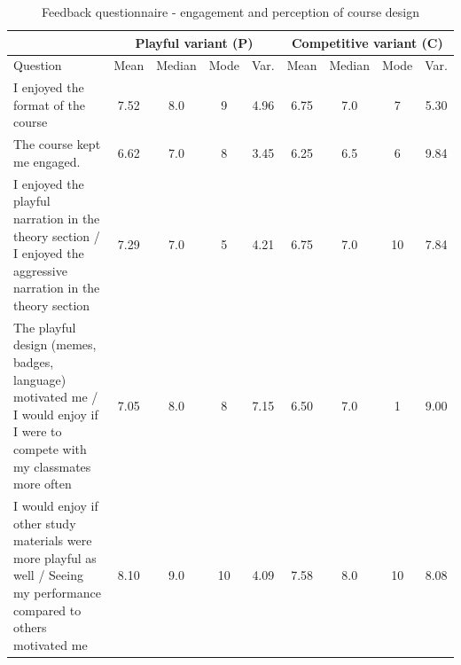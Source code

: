 \FloatBarrier
\begin{table}[h]
\centering
\small
\renewcommand{\arraystretch}{1.2}
\begin{tabular}{>{\raggedright\arraybackslash}p{4cm}|cccc|cccc}
\hline
 & \multicolumn{4}{c|}{Playful variant (P)} & \multicolumn{4}{c}{Competitive variant (C)} \\
\hline
Question & Mean & Median & Mode & Var. & Mean & Median & Mode & Var. \\
\hline

I enjoyed the format of the course 
& 7.52 & 8.0 & 9 & 4.96 & 6.75 & 7.0 & 7 & 5.30 \\

The course kept me engaged. 
& 6.62 & 7.0 & 8 & 3.45 & 6.25 & 6.5 & 6 & 9.84 \\

I enjoyed the playful narration in the theory section / I enjoyed the aggressive narration in the theory section 
& 7.29 & 7.0 & 5 & 4.21 & 6.75 & 7.0 & 10 & 7.84 \\

The playful design (memes, badges, language) motivated me / I would enjoy if I were to compete with my classmates more often 
& 7.05 & 8.0 & 8 & 7.15 & 6.50 & 7.0 & 1 & 9.00 \\

I would enjoy if other study materials were more playful as well / Seeing my performance compared to others motivated me 
& 8.10 & 9.0 & 10 & 4.09 & 7.58 & 8.0 & 10 & 8.08 \\

\hline
\end{tabular}
\caption{Feedback questionnaire - engagement and perception of course design}
\end{table}
\FloatBarrier